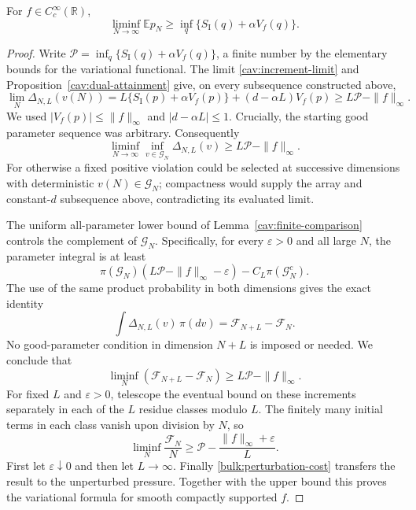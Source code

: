 \begin{proposition}\label{cav:lower-bound}
For $f\in C_c^\infty(\mathbb R)$,
\[
 \liminf_{N\to\infty}\mathbb E p_N
 \ge\inf_q\{S_{\mathrm I}(q)+\alpha V_f(q)\}.
\]
\end{proposition}

\begin{proof}
Write $\mathcal P=\inf_q\{S_{\mathrm I}(q)+\alpha V_f(q)\}$, a finite
number by the elementary bounds for the variational functional.  The
limit \eqref{cav:increment-limit} and
Proposition~\ref{cav:dual-attainment} give, on every subsequence
constructed above,
\[
 \lim_N\Delta_{N,L}(v(N))
 =L\{S_{\mathrm I}(p)+\alpha V_f(p)\}
                +(d-\alpha L)V_f(p)
 \ge L\mathcal P-\|f\|_\infty.
\]
We used $|V_f(p)|\le\|f\|_\infty$ and $|d-\alpha L|\le1$.
Crucially, the starting good parameter sequence was arbitrary.
Consequently
\begin{equation}\label{cav:uniform-liminf}
 \liminf_{N\to\infty}\inf_{v\in\mathcal G_N}\Delta_{N,L}(v)
 \ge L\mathcal P-\|f\|_\infty.
\end{equation}
For otherwise a fixed positive violation could be selected at
successive dimensions with deterministic $v(N)\in\mathcal G_N$;
compactness would supply the array and constant-$d$ subsequence above,
contradicting its evaluated limit.

The uniform all-parameter lower bound of
Lemma~\ref{cav:finite-comparison} controls the complement of
$\mathcal G_N$.  Specifically, for every $\varepsilon>0$ and all large
$N$, the parameter integral is at least
\[
 \pi(\mathcal G_N)
       (L\mathcal P-\|f\|_\infty-\varepsilon)
       -C_L\pi(\mathcal G_N^c).
\]
The use of the same product probability in both dimensions gives the
exact identity
\[
 \int\Delta_{N,L}(v)\,\pi(dv)=\mathcal F_{N+L}-\mathcal F_N.
\]
No good-parameter condition in dimension $N+L$ is imposed or needed.
We conclude that
\[
 \liminf_N(\mathcal F_{N+L}-\mathcal F_N)
       \ge L\mathcal P-\|f\|_\infty.
\]
For fixed $L$ and $\varepsilon>0$, telescope the eventual bound on
these increments separately in each of the $L$ residue classes modulo
$L$.  The finitely many initial terms in each class vanish upon division
by $N$, so
\[
 \liminf_N\frac{\mathcal F_N}{N}
 \ge\mathcal P-\frac{\|f\|_\infty+\varepsilon}{L}.
\]
First let $\varepsilon\downarrow0$ and then let $L\to\infty$.
Finally \eqref{bulk:perturbation-cost} transfers the result to the
unperturbed pressure.  Together with the upper bound this proves the
variational formula for smooth compactly supported $f$.
\end{proof}
